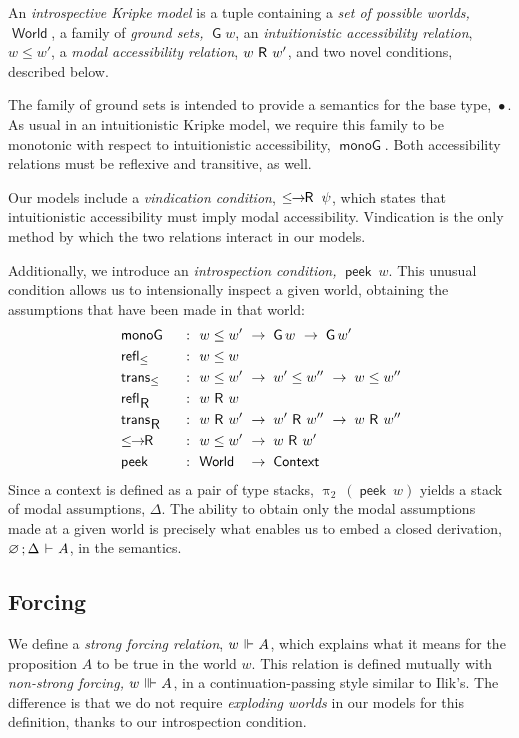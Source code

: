 \documentclass[submission,copyright,creativecommons,sharealike,backref=page]{eptcs}
\newcommand{\R}{\mathrel{\rlap{$\mkern.75mu\textsf{R}$}\hphantom{\subseteq}}}
\renewcommand{\:}{\mathop{\mkern3mu:\mkern3mu}}
\renewcommand{\.}{\mathop{\mkern3mu.\mkern3mu}}
\renewcommand{\;}{\mathop{;}}
\renewcommand{\,}{\mathop{,}}
\newcommand{\e}{\mathrel{\mkern2mu\vdash\mkern1mu}}
\newcommand{\ee}{\mathrel{\mkern2mu\Vdash\mkern1mu}}
\newcommand{\eee}{\mathrel{\mkern2mu\Vvdash\mkern1mu}}
\renewcommand{\r}{\mathrel{\rightarrow\mkern-1mu}}
\newcommand{\peek}{\operatorname{\textsf{peek}}}
\newcommand{\piii}{\operatorname{\uppi_{\scriptscriptstyle{2}}}}
\newcommand{\reflle}{\operatorname{\textsf{refl}_{\le}}}
\newcommand{\reflR}{\operatorname{\textsf{refl}_{\R}}}
\newcommand{\transle}{\operatorname{\textsf{trans}_{\le}}}
\newcommand{\transR}{\operatorname{\textsf{trans}_{\R}}}
\newcommand{\lerR}{\operatorname{\le\mkern-1mu\r\mkern-1mu\R}}
\newcommand{\Context}{\operatorname{\textsf{Context}}}
\newcommand{\World}{\operatorname{\textsf{World}}}
\newcommand{\G}{\operatorname{\textsf{G}}}
\newcommand{\monoG}{\operatorname{\textsf{monoG}}}
\newcommand{\base}{\mathop{\bullet}}
\renewcommand{\O}{\varnothing}
\theoremstyle{mystyle}
\begin{document}
An \emph{introspective Kripke model} is a tuple containing a \emph{set of possible worlds,} $\World$, a family of \emph{ground sets,} $\G w$, an \emph{intuitionistic accessibility relation}, $w \le w'$, a \emph{modal accessibility relation}, $w \R w'$, and two novel conditions, described below.

The family of ground sets is intended to provide a semantics for the base type, $\base$.  As usual in an intuitionistic Kripke model, we require this family to be monotonic with respect to intuitionistic accessibility, $\monoG$.  Both accessibility relations must be reflexive and transitive, as well.

Our models include a \emph{vindication condition}, $\lerR~\psi$, which states that intuitionistic accessibility must imply modal accessibility.  Vindication is the only method by which the two relations interact in our models.

Additionally, we introduce an \emph{introspection condition,} $\peek~w$.  This unusual condition allows us to intensionally inspect a given world, obtaining the assumptions that have been made in that world:
\begin{alignat*}{2}
  & \monoG   && ~\:~ w \le w' ~\r~ \G w ~\r~ \G w'\\
  & \reflle  && ~\:~ w \le w\\
  & \transle && ~\:~ w \le w' ~\r~ w' \le w'' ~\r~ w \le w''\\
  & \reflR   && ~\:~ w \R w\\
  & \transR  && ~\:~ w \R w' ~\r~ w' \R w'' ~\r~ w \R w''\\
  & \lerR    && ~\:~ w \le w' ~\r~ w \R w'\\
  & \peek    && ~\:~ \rlap{$\World$}\hphantom{w \le w'} ~\r~ \Context
\end{alignat*}
Since a context is defined as a pair of type stacks, $\piii~(\peek~w)$ yields a stack of modal assumptions, $\Delta$.  The ability to obtain only the modal assumptions made at a given world is precisely what enables us to embed a closed derivation, $\O \; \Delta \e A$, in the semantics.

\subsection{Forcing}

We define a \emph{strong forcing relation}, $w \ee A$, which explains what it means for the proposition $A$ to be true in the world $w$.  This relation is defined mutually with \emph{non-strong forcing,} $w \eee A$, in a continuation-passing style similar to Ilik's.  The difference is that we do not require \emph{exploding worlds} in our models for this definition, thanks to our introspection condition.
\end{document}
